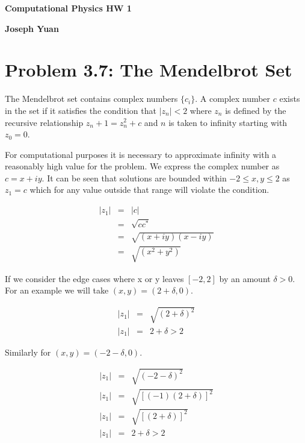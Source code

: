 \documentclass[12pt]{article}
\begin{document}
{\Large
\textbf{Computational Physics HW 1}

\textbf{Joseph Yuan}
}

\section*{Problem 3.7: The Mendelbrot Set}

The Mendelbrot set contains complex numbers $\{c_i\}$.  A complex number $c$ exists in the set if it satisfies the condition that $|z_n| < 2$ where $z_n$ is defined by the recursive relationship $z_n+1 = z_n^2 + c$ and $n$ is taken to infinity starting with $z_0 = 0$.

For computational purposes it is necessary to approximate infinity with a reasonably high value for the problem.  We express the complex number as $c = x + iy$.  It can be seen that solutions are bounded within $-2 \le x,y \le 2$ as $z_1 = c$ which for any value outside that range will violate the condition.

\begin{equation}
\begin{array}{rcl}
|z_1|&=&|c|\\
&=&\sqrt{cc^*}\\
&=&\sqrt{(x+iy)(x-iy)}\\
&=&\sqrt{(x^2+y^2)}
\end{array}
\end{equation}

If we consider the edge cases where x or y leaves $[-2,2]$ by an amount $\delta > 0$.  For an example we will take $(x,y) = (2+\delta,0)$.

\begin{equation}
\begin{array}{rcl}
|z_1|&=&\sqrt{(2+\delta)^2} \\
|z_1|&=&2+\delta > 2
\end{array}
\end{equation}

Similarly for  $(x,y) = (-2-\delta,0)$.

\begin{equation}
\begin{array}{rcl}
|z_1|&=&\sqrt{(-2-\delta)^2} \\
|z_1|&=&\sqrt{[(-1)(2+\delta)]^2} \\
|z_1|&=&\sqrt{[(2+\delta)]^2} \\
|z_1|&=&2+\delta > 2
\end{array}
\end{equation}
\end{document}
